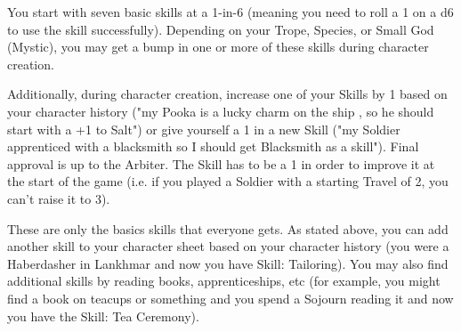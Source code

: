 {  \cbreak
  

  You start with seven basic skills at a 1-in-6 (meaning you need to roll a 1 on a d6 to use the skill successfully).  Depending on your Trope, Species, or Small God (Mystic), you may get a bump in one or more of these skills during character creation.

  Additionally, during character creation, increase one of your Skills by 1 based on your character history ("my Pooka is a lucky charm on the ship , so he should start with a +1 to Salt") or give yourself a 1 in a new Skill ("my Soldier apprenticed with a blacksmith so I should get Blacksmith as a skill").  Final approval is up to the Arbiter.  The Skill has to be a 1 in order to improve it at the start of the game (i.e. if you played a Soldier with a starting Travel of 2, you can't raise it to 3). 


  These are only the basics skills that everyone gets.  As stated above, you can add another skill to your character sheet based on your character history (you were a Haberdasher in Lankhmar and now you have Skill: Tailoring).  You may also find additional skills by reading books, apprenticeships, etc (for example, you might find a book on teacups or something and you spend a Sojourn reading it and now you have the Skill: Tea Ceremony).


}
